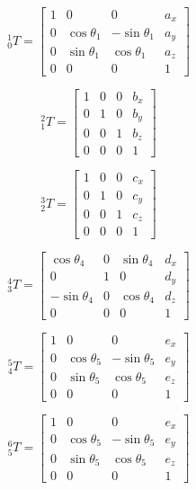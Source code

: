 \begin{multicols}{2}
\[
{}_{0}^{1}T = 
\begin{bmatrix}
    1 & 0 & 0 & {a}_x  \\
    0 & \cos{\theta_1} & -\sin{\theta_1} & {a}_y \\
    0 & \sin{\theta_1} & \cos{\theta_1} & {a}_z \\
    0 & 0 & 0 & 1
\end{bmatrix}
\]


\[
{}_{1}^{2}T = 
\begin{bmatrix}
    1 & 0 & 0 & b_x  \\
    0 & 1 & 0 & b_y \\
    0 & 0 & 1 & b_z \\
    0 & 0 & 0 & 1
\end{bmatrix}
\]


\[
{}_{2}^{3}T = 
\begin{bmatrix}
    1 & 0 & 0 & c_x  \\
    0 & 1 & 0 & c_y \\
    0 & 0 & 1 & c_z \\
    0 & 0 & 0 & 1
\end{bmatrix}
\]

\[
{}_{3}^{4}T = 
\begin{bmatrix}
    \cos{\theta_4} & 0 & \sin{\theta_4} & d_x  \\
    0 & 1 & 0 & d_y \\
    -\sin{\theta_4} & 0 & \cos{\theta_4} & d_z \\
    0 & 0 & 0 & 1
\end{bmatrix}
\]

\[
{}_{4}^{5}T = 
\begin{bmatrix}
    1 & 0 & 0 & e_x  \\
    0 & \cos{\theta_5} & -\sin{\theta_5} & e_y \\
    0 & \sin{\theta_5} & \cos{\theta_5} & e_z \\
    0 & 0 & 0 & 1
\end{bmatrix}
\]

\[
{}_{5}^{6}T = 
\begin{bmatrix}
    1 & 0 & 0 & e_x  \\
    0 & \cos{\theta_5} & -\sin{\theta_5} & e_y \\
    0 & \sin{\theta_5} & \cos{\theta_5} & e_z \\
    0 & 0 & 0 & 1
\end{bmatrix}
\]

\end{multicols}


